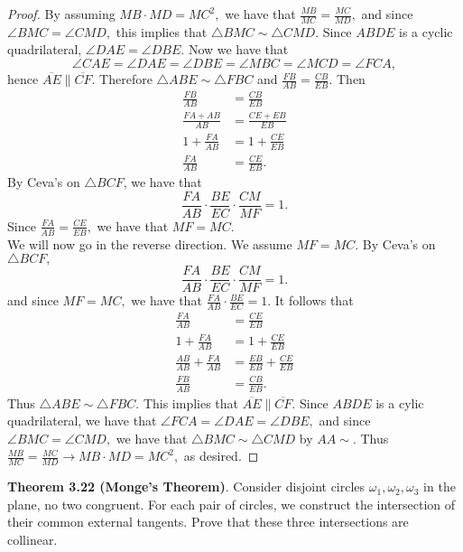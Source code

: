 \documentclass[letterpaper,oneside]{book}
\providecommand{\ol}{\overline}
\begin{document}
\begin{proof}
  By assuming $MB\cdot  MD = MC^2,$ we have that $\frac{MB}{MC} = \frac{MC}{MD},$ and since $\angle BMC = \angle CMD,$ this implies that $\triangle BMC \sim \triangle CMD$. Since $ABDE$ is a cyclic quadrilateral, $\angle DAE = \angle DBE.$ Now we have that
  $$\angle CAE = \angle DAE = \angle DBE = \angle MBC = \angle MCD = \angle FCA,$$
  hence $\ol{AE} \parallel \ol{CF}.$ Therefore $\triangle ABE \sim \triangle FBC$ and $\frac{FB}{AB} = \frac{CB}{EB}.$ Then 
  \begin{align*}
    \frac{FB}{AB} &= \frac{CB}{EB} \\
    \frac{FA + AB}{AB} &= \frac{CE + EB}{EB} \\
    1 + \frac{FA}{AB} &= 1 + \frac{CE}{EB} \\
    \frac{FA}{AB}&=\frac{CE}{EB}.
  \end{align*}
  By Ceva's on $\triangle BCF$, we have that
  $$\frac{FA}{AB}\cdot\frac{BE}{EC}\cdot\frac{CM}{MF} = 1.$$
  Since $\frac{FA}{AB}=\frac{CE}{EB},$ we have that $MF = MC.$ \\

  We will now go in the reverse direction. We assume $MF = MC.$ By Ceva's on $\triangle BCF,$ 
  $$\frac{FA}{AB}\cdot\frac{BE}{EC}\cdot\frac{CM}{MF} = 1.$$
  and since $MF = MC,$ we have that $\frac{FA}{AB}\cdot\frac{BE}{EC} = 1.$ It follows that
  \begin{align*}
    \frac{FA}{AB} &= \frac{CE}{EB} \\
    1 + \frac{FA}{AB} &= 1 + \frac{CE}{EB}\\
    \frac{AB}{AB} + \frac{FA}{AB} &= \frac{EB}{EB} + \frac{CE}{EB} \\
    \frac{FB}{AB} &= \frac{CB}{EB}. 
  \end{align*}
  Thus $\triangle ABE \sim \triangle FBC.$ This implies that $\ol{AE} \parallel \ol{CF}.$  Since $ABDE$ is a cylic quadrilateral, we have that $\angle FCA = \angle DAE = \angle DBE,$ and since $\angle BMC = \angle CMD,$ we have that $\triangle BMC \sim \triangle CMD$ by $AA\sim.$ Thus $\frac{MB}{MC} = \frac{MC}{MD} \rightarrow MB\cdot MD = MC^2,$ as desired. 
\end{proof}

\textbf{Theorem 3.22 (Monge’s Theorem)}. Consider disjoint circles $\omega_1, \omega_2, \omega_3$ in the plane, no two congruent. For each pair of circles, we construct the intersection of their common external tangents. Prove that these three intersections are collinear. 
\end{document}
